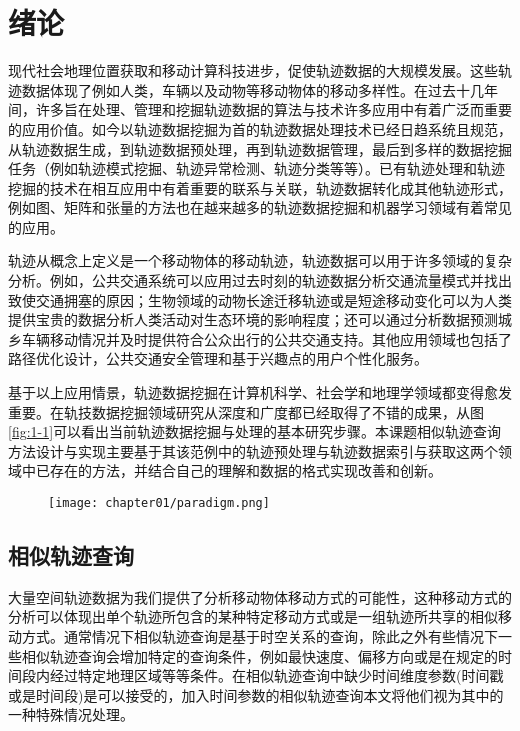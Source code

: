 

\chapter{绪论}
\label{chap:introduction}

现代社会地理位置获取和移动计算科技进步，促使轨迹数据的大规模发展。这些轨迹数据体现了例如人类，车辆以及动物等移动物体的移动多样性。在过去十几年间，许多旨在处理、管理和挖掘轨迹数据的算法与技术许多应用中有着广泛而重要的应用价值。如今以轨迹数据挖掘为首的轨迹数据处理技术已经日趋系统且规范，从轨迹数据生成，到轨迹数据预处理，再到轨迹数据管理，最后到多样的数据挖掘任务（例如轨迹模式挖掘、轨迹异常检测、轨迹分类等等）。已有轨迹处理和轨迹挖掘的技术在相互应用中有着重要的联系与关联，轨迹数据转化成其他轨迹形式，例如图、矩阵和张量的方法也在越来越多的轨迹数据挖掘和机器学习领域有着常见的应用。

轨迹从概念上定义是一个移动物体的移动轨迹，轨迹数据可以用于许多领域的复杂分析。例如，公共交通系统可以应用过去时刻的轨迹数据分析交通流量模式并找出致使交通拥塞的原因；生物领域的动物长途迁移轨迹或是短途移动变化可以为人类提供宝贵的数据分析人类活动对生态环境的影响程度；还可以通过分析数据预测城乡车辆移动情况并及时提供符合公众出行的公共交通支持。其他应用领域也包括了路径优化设计，公共交通安全管理和基于兴趣点的用户个性化服务。

基于以上应用情景，轨迹数据挖掘在计算机科学、社会学和地理学领域都变得愈发重要。在轨技数据挖掘领域研究从深度和广度都已经取得了不错的成果，从图\ref{fig:1-1}可以看出当前轨迹数据挖掘与处理的基本研究步骤。本课题相似轨迹查询方法设计与实现主要基于其该范例中的轨迹预处理与轨迹数据索引与获取这两个领域中已存在的方法，并结合自己的理解和数据的格式实现改善和创新。

\begin{figure}[!htp]
  \centering
  \texttt{[image: chapter01/paradigm.png]}
\end{figure}


\section{相似轨迹查询}
\label{sec:requirements}
大量空间轨迹数据为我们提供了分析移动物体移动方式的可能性，这种移动方式的分析可以体现出单个轨迹所包含的某种特定移动方式或是一组轨迹所共享的相似移动方式。通常情况下相似轨迹查询是基于时空关系的查询，除此之外有些情况下一些相似轨迹查询会增加特定的查询条件，例如最快速度、偏移方向或是在规定的时间段内经过特定地理区域等等条件。在相似轨迹查询中缺少时间维度参数(时间戳或是时间段)是可以接受的，加入时间参数的相似轨迹查询本文将他们视为其中的一种特殊情况处理。
\\

